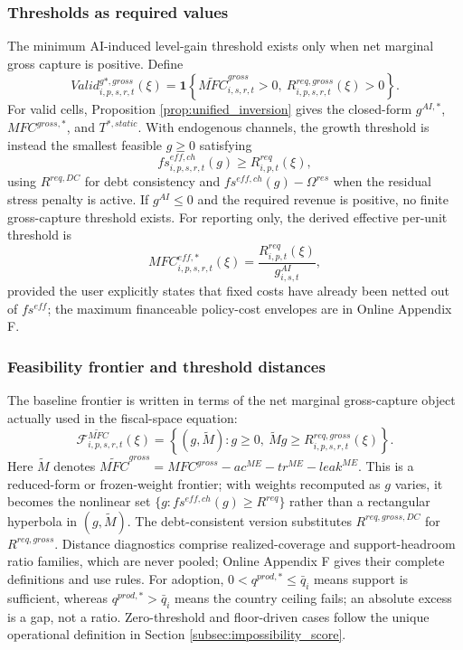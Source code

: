 \documentclass[11pt,a4paper]{article}
\begin{document}
\subsubsection{Thresholds as required values}

The minimum AI-induced level-gain threshold exists only when net marginal gross capture is positive. Define
\begin{equation}\label{eq:valid_growth_threshold_v20}
    Valid^{g*,gross}_{i,p,s,r,t}(\xi)
    =\mathbf{1}\left\{\widetilde{MFC}^{gross}_{i,s,r,t}>0,\ R^{req,gross}_{i,p,s,r,t}(\xi)>0\right\}.
\end{equation}
For valid cells, Proposition \ref{prop:unified_inversion} gives the closed-form $g^{AI,*}$, $MFC^{gross,*}$, and $T^{*,static}$. With endogenous channels, the growth threshold is instead the smallest feasible $g\geq0$ satisfying
\begin{equation}\label{eq:gstar_channel_root_v24}
    fs^{eff,ch}_{i,p,s,r,t}(g)\geq R^{req}_{i,p,t}(\xi),
\end{equation}
using $R^{req,DC}$ for debt consistency and $fs^{eff,ch}(g)-\Omega^{res}$ when the residual stress penalty is active.
If $g^{AI}\leq0$ and the required revenue is positive, no finite gross-capture threshold exists. For reporting only, the derived effective per-unit threshold is
\begin{equation}\label{eq:mfcstar_eff_main_v17}
    MFC^{eff,*}_{i,p,s,r,t}(\xi)=\frac{R^{req}_{i,p,t}(\xi)}{g^{AI}_{i,s,t}},
\end{equation}
    provided the user explicitly states that fixed costs have already been netted out of $fs^{eff}$; the maximum financeable policy-cost envelopes are in Online Appendix F.

\subsubsection{Feasibility frontier and threshold distances}

The baseline frontier is written in terms of the net marginal gross-capture object actually used in the fiscal-space equation:
\begin{equation}\label{eq:frontier_main_v10}
    \mathcal{F}^{\widetilde{MFC}}_{i,p,s,r,t}(\xi)=
    \left\{(g,\widetilde M):g\geq0,\ \widetilde M g\geq R^{req,gross}_{i,p,s,r,t}(\xi)\right\}.
\end{equation}
Here $\widetilde M$ denotes $\widetilde{MFC}^{gross}=MFC^{gross}-ac^{ME}-tr^{ME}-leak^{ME}$. This is a reduced-form or frozen-weight frontier; with weights recomputed as $g$ varies, it becomes the nonlinear set $\{g:fs^{eff,ch}(g)\geq R^{req}\}$ rather than a rectangular hyperbola in $(g,\widetilde M)$. The debt-consistent version substitutes $R^{req,gross,DC}$ for $R^{req,gross}$. Distance diagnostics comprise realized-coverage and support-headroom ratio families, which are never pooled; Online Appendix F gives their complete definitions and use rules.
For adoption, $0<q^{prod,*}\leq\bar q_i$ means support is sufficient, whereas $q^{prod,*}>\bar q_i$ means the country ceiling fails; an absolute excess is a gap, not a ratio. Zero-threshold and floor-driven cases follow the unique operational definition in Section \ref{subsec:impossibility_score}.
\end{document}
